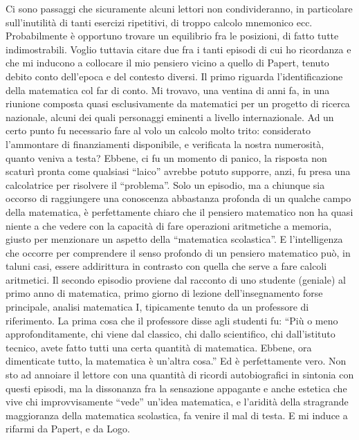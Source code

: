 Ci sono passaggi che sicuramente alcuni lettori non condivideranno, in particolare sull'inutilità di tanti esercizi ripetitivi, di troppo calcolo mnemonico ecc. Probabilmente è opportuno trovare un equilibrio fra le posizioni, di fatto tutte indimostrabili. Voglio tuttavia citare due fra i tanti episodi di cui ho ricordanza e che mi inducono a collocare il mio pensiero vicino a quello di Papert, tenuto debito  conto dell'epoca e del contesto diversi. Il primo riguarda l'identificazione della matematica col far di conto. Mi trovavo, una ventina di anni fa, in una riunione composta quasi esclusivamente da matematici per un progetto di ricerca nazionale, alcuni dei quali personaggi eminenti a livello internazionale. Ad un certo punto fu necessario fare al volo un calcolo molto trito: considerato l'ammontare di finanziamenti disponibile, e verificata la nostra numerosità, quanto veniva a testa? Ebbene, ci fu un momento di panico, la risposta non scaturì pronta come qualsiasi “laico” avrebbe potuto supporre, anzi, fu presa una calcolatrice per risolvere il “problema”. Solo un episodio, ma a chiunque sia occorso di raggiungere una conoscenza abbastanza profonda di un qualche campo della matematica, è perfettamente chiaro che il pensiero matematico non ha quasi niente a che vedere con la capacità di fare operazioni aritmetiche a memoria, giusto per menzionare un aspetto della “matematica scolastica”. E l'intelligenza che occorre per comprendere il  senso profondo di un pensiero matematico può, in taluni casi, essere addirittura in contrasto con quella che serve a fare calcoli aritmetici. Il secondo episodio proviene dal racconto di uno studente (geniale) al primo anno di matematica, primo giorno di lezione dell'insegnamento forse principale, analisi matematica I, tipicamente tenuto da un professore di riferimento. La prima cosa che il professore disse agli studenti fu: “Più o meno approfonditamente, chi viene dal classico, chi dallo scientifico, chi dall'istituto tecnico, avete fatto tutti una certa quantità di matematica. Ebbene, ora dimenticate tutto, la matematica è un'altra cosa.”  Ed è perfettamente vero. Non sto ad annoiare il lettore con una quantità di ricordi autobiografici in sintonia con questi episodi, ma la dissonanza fra la sensazione appagante e anche estetica  che vive chi improvvisamente “vede” un'idea matematica, e l'aridità della stragrande maggioranza della matematica scolastica, fa venire il mal di testa. E mi induce a rifarmi da Papert, e da Logo.

